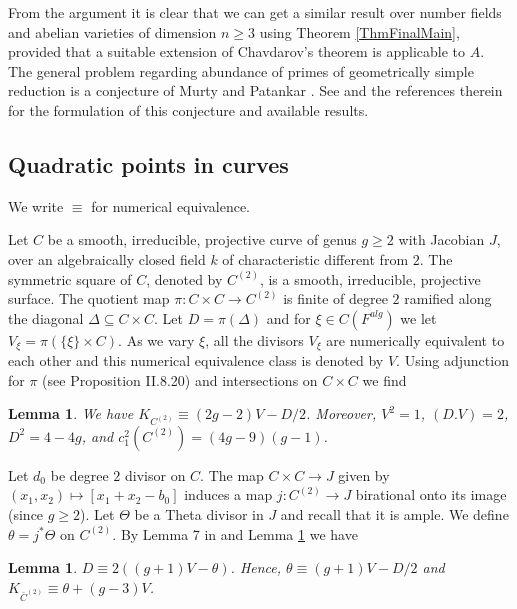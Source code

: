 \documentclass[11pt]{amsart}
\newtheorem{lemma}[theorem]{Lemma}
\theoremstyle{remark}
\numberwithin{equation}{section}
\begin{document}
From the argument it is clear that we can get a similar result over number fields and abelian varieties of dimension $n\ge 3$ using Theorem \ref{ThmFinalMain}, provided that a suitable extension of Chavdarov's theorem is applicable to $A$. The general problem regarding abundance of primes of geometrically simple reduction is a conjecture of Murty and Patankar \cite{MurtyPatankar}. See \cite{Zywina} and the references therein for the formulation of this conjecture and available results.


\subsection{Quadratic points in curves} \label{SecApp3} We write $\equiv$ for numerical equivalence.

Let $C$ be a smooth,  irreducible, projective curve of genus $g\ge 2$ with Jacobian $J$, over an algebraically closed field $k$ of characteristic different from $2$. The symmetric square of $C$,  denoted by $C^{(2)}$, is a smooth, irreducible, projective surface. The quotient map $\pi:C\times C\to C^{(2)}$ is finite of degree $2$ ramified along the diagonal $\Delta\subseteq C\times C$. Let $D=\pi(\Delta)$ and for $\xi \in C(F^{alg})$ we let $V_\xi=\pi(\{\xi\}\times C)$. As we vary $\xi$, all the divisors $V_\xi$ are numerically equivalent to each other and this numerical equivalence class  is denoted by $V$.  Using adjunction for $\pi$ (see \cite{Hartshorne} Proposition II.8.20) and intersections on $C\times C$ we find


\begin{lemma}\label{LemmaKSymm2} We have $K_{C^{(2)}}\equiv (2g-2)V-D/2$. Moreover, $V^2=1$, $(D.V)=2$, $D^2=4-4g$, and $c_1^2(C^{(2)})=(4g-9)(g-1)$.
\end{lemma}


Let $d_0$ be degree $2$ divisor on $C$. The map $C\times C\to J$ given by $(x_1,x_2)\mapsto [x_1+x_2-b_0]$ induces a  map $j:C^{(2)}\to J$ birational onto its image (since $g\ge 2$). Let $\Theta$ be a Theta divisor in $J$ and recall that it is ample.  We define $\theta=j^*\Theta$ on $C^{(2)}$. By Lemma 7 in \cite{KouvidakisTAMS93} and Lemma \ref{LemmaKSymm2} we have
 
 \begin{lemma}\label{LemmaThetaC2} $D\equiv 2((g+1)V-\theta)$. Hence, $\theta\equiv (g+1)V-D/2$ and $K_{\overline{C}^{(2)}}\equiv \theta + (g-3)V$.
\end{lemma}
\end{document}
